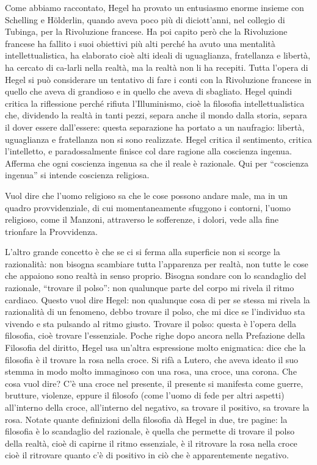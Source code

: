 \documentclass[a4paper,12pt,oneside,openany]{book}%
\begin{document}
Come abbiamo raccontato, Hegel ha provato un entusiasmo enorme insieme con Schelling e Hölderlin, quando aveva poco più di diciott’anni, nel collegio di Tubinga, per la Rivoluzione francese. Ha poi capito però che la Rivoluzione francese ha fallito i suoi obiettivi più alti perché ha avuto una mentalità intellettualistica, ha elaborato cioè alti ideali di uguaglianza, fratellanza e libertà, ha cercato di ca-larli nella realtà, ma la realtà non li ha recepiti. Tutta l’opera di Hegel si può considerare un tentativo di fare i conti con la Rivoluzione francese in quello che aveva di grandioso e in quello che aveva di sbagliato. Hegel quindi critica la riflessione perché rifiuta l’Illuminismo, cioè la filosofia intellettualistica che, dividendo la realtà in tanti pezzi, separa anche il mondo dalla storia, separa il dover essere dall’essere: questa separazione ha portato a un naufragio: libertà, uguaglianza e fratellanza non si sono realizzate. Hegel critica il sentimento, critica l’intelletto, e paradossalmente finisce col dare ragione alla coscienza ingenua. Afferma che ogni coscienza ingenua sa che il reale è razionale. Qui per “coscienza ingenua” si intende coscienza religiosa.

Vuol dire che l’uomo religioso sa che le cose possono andare male, ma in un quadro provvidenziale, di cui momentaneamente sfuggono i contorni, l’uomo religioso, come il Manzoni, attraverso le sofferenze, i dolori, vede alla fine trionfare la Provvidenza.

L’altro grande concetto è che se ci si ferma alla superficie non si scorge la razionalità: non bisogna scambiare tutta l’apparenza per realtà, non tutte le cose che appaiono sono realtà in senso proprio. Bisogna sondare con lo scandaglio del razionale, “trovare il polso”: non qualunque parte del corpo mi rivela il ritmo cardiaco. Questo vuol dire Hegel: non qualunque cosa di per se stessa mi rivela la razionalità di un fenomeno, debbo trovare il polso, che mi dice se l’individuo sta vivendo e sta pulsando al ritmo giusto. Trovare il polso: questa è l’opera della filosofia, cioè trovare l’essenziale. Poche righe dopo ancora nella Prefazione della Filosofia del diritto, Hegel usa un’altra espressione molto enigmatica: dice che la filosofia è il trovare la rosa nella croce. Si rifà a Lutero, che aveva ideato il suo stemma in modo molto immaginoso con una rosa, una croce, una corona. Che cosa vuol dire? C’è una croce nel presente, il presente si manifesta come guerre, brutture, violenze, eppure il filosofo (come l’uomo di fede per altri aspetti) all’interno della croce, all’interno del negativo, sa trovare il positivo, sa trovare la rosa. Notate quante definizioni della filosofia dà Hegel in due, tre pagine: la filosofia è lo scandaglio del razionale, è quella che permette di trovare il polso della realtà, cioè di capirne il ritmo essenziale, è il ritrovare la rosa nella croce cioè il ritrovare quanto c’è di positivo in ciò che è apparentemente negativo.
\end{document}
